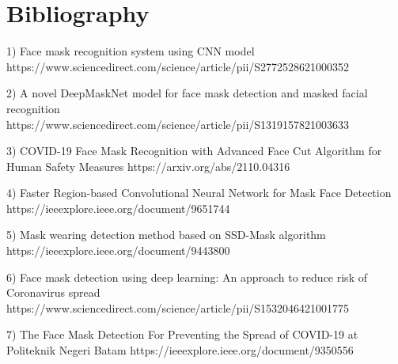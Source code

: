 \section{Bibliography} 
1) Face mask recognition system using CNN model https://www.sciencedirect.com/science/article/pii/S2772528621000352

2) A novel DeepMaskNet model for face mask detection and masked facial
recognition
https://www.sciencedirect.com/science/article/pii/S1319157821003633

3) COVID-19 Face Mask Recognition with Advanced Face Cut Algorithm for Human Safety Measures https://arxiv.org/abs/2110.04316

4) Faster Region-based Convolutional Neural Network 
for Mask Face Detection 
https://ieeexplore.ieee.org/document/9651744

5) Mask wearing detection method based on SSD-Mask algorithm
https://ieeexplore.ieee.org/document/9443800

6) Face mask detection using deep learning: An approach to reduce risk of 
Coronavirus spread
https://www.sciencedirect.com/science/article/pii/S1532046421001775

7) The Face Mask Detection For Preventing the Spread 
of COVID-19 at Politeknik Negeri Batam
https://ieeexplore.ieee.org/document/9350556
